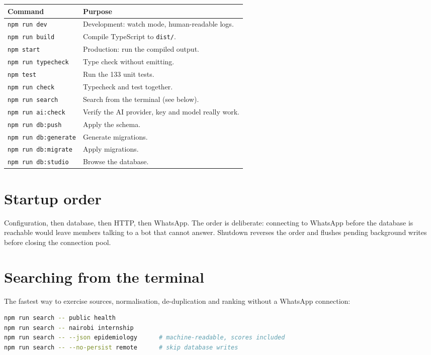 \documentclass[11pt,a4paper]{report}
\begin{document}
\begin{center}
\begin{tabularx}{\textwidth}{@{}lX@{}}
\toprule
\textbf{Command} & \textbf{Purpose} \\
\midrule
\texttt{npm run dev} & Development: watch mode, human-readable logs. \\
\texttt{npm run build} & Compile TypeScript to \texttt{dist/}. \\
\texttt{npm start} & Production: run the compiled output. \\
\texttt{npm run typecheck} & Type check without emitting. \\
\texttt{npm test} & Run the 133 unit tests. \\
\texttt{npm run check} & Typecheck and test together. \\
\texttt{npm run search} & Search from the terminal (see below). \\
\texttt{npm run ai:check} & Verify the AI provider, key and model really work. \\
\texttt{npm run db:push} & Apply the schema. \\
\texttt{npm run db:generate} & Generate migrations. \\
\texttt{npm run db:migrate} & Apply migrations. \\
\texttt{npm run db:studio} & Browse the database. \\
\bottomrule
\end{tabularx}
\end{center}

\section{Startup order}

Configuration, then database, then HTTP, then WhatsApp. The order is
deliberate: connecting to WhatsApp before the database is reachable would leave
members talking to a bot that cannot answer. Shutdown reverses the order and
flushes pending background writes before closing the connection pool.

\section{Searching from the terminal}

The fastest way to exercise sources, normalisation, de-duplication and ranking
without a WhatsApp connection:

\begin{lstlisting}[language=bash]
npm run search -- public health
npm run search -- nairobi internship
npm run search -- --json epidemiology      # machine-readable, scores included
npm run search -- --no-persist remote      # skip database writes
\end{lstlisting}
\end{document}
